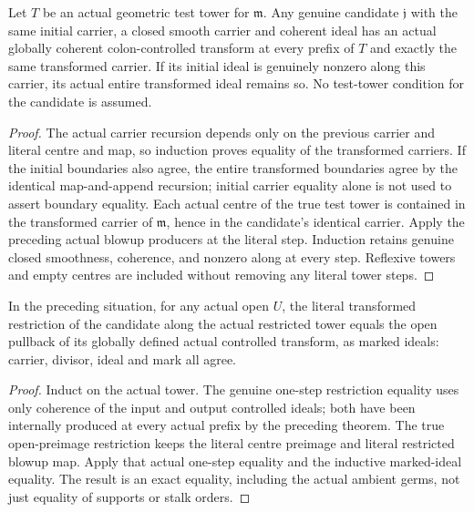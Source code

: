 \begin{theorem}
\label{hir:coherent-transform-entire-tower}
\leanok
Let $T$ be an actual geometric test tower for $\mathfrak m$. Any genuine
candidate $\mathfrak j$ with the same initial carrier, a closed smooth
carrier and coherent ideal has an actual globally coherent colon-controlled
transform at every prefix of $T$ and exactly the same transformed carrier.
If its initial ideal is genuinely nonzero along this carrier, its actual
entire transformed ideal remains so. No test-tower condition for the
candidate is assumed.
\end{theorem}
\begin{proof}
The actual carrier recursion depends only on the previous carrier and
literal centre and map, so induction proves equality of the transformed
carriers. If the initial boundaries also agree, the entire transformed
boundaries agree by the identical map-and-append recursion; initial carrier
equality alone is not used to assert boundary equality. Each actual centre
of the true test tower is contained in the
transformed carrier of $\mathfrak m$, hence in the candidate's identical
carrier. Apply the preceding actual blowup producers at the literal step.
Induction retains genuine closed smoothness, coherence, and nonzero along
at every step. Reflexive towers and empty centres are included without
removing any literal tower steps.
\end{proof}

\begin{theorem}
\label{hir:coherent-transform-restriction-identity}
\leanok
In the preceding situation, for any actual open $U$, the literal transformed
restriction of the candidate along the actual restricted tower equals the
open pullback of its globally defined actual controlled transform, as marked
ideals: carrier, divisor, ideal and mark all agree.
\end{theorem}
\begin{proof}
Induct on the actual tower. The genuine one-step restriction equality uses
only coherence of the input and output controlled ideals; both have been
internally produced at every actual prefix by the preceding theorem.
The true open-preimage restriction keeps the literal centre preimage and
literal restricted blowup map. Apply that actual one-step equality and the
inductive marked-ideal equality. The result is an exact equality, including
the actual ambient germs, not just equality of supports or stalk orders.
\end{proof}

